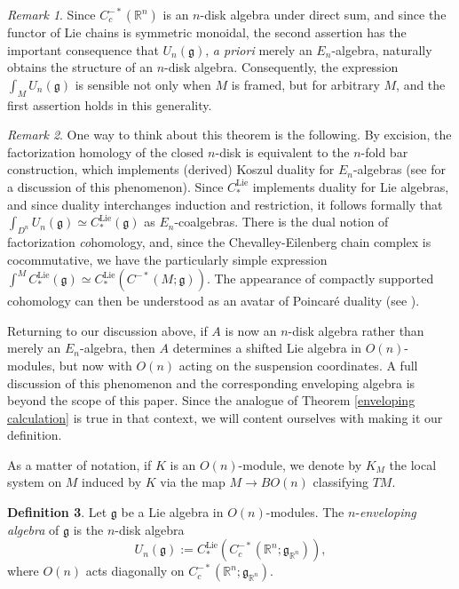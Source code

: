 \documentclass{compositio}
\theoremstyle{definition}\newtheorem{definition}{Definition}[section]
\theoremstyle{theorem}\newtheorem{lemma}[definition]{Lemma}
\theoremstyle{remark}\newtheorem*{conventions}{Conventions}
\theoremstyle{remark}\newtheorem*{acknowledgments}{Acknowledgments}
\theoremstyle{remark}\newtheorem*{outline}{Outline}
\theoremstyle{remark}\newtheorem*{questions}{Questions}
\theoremstyle{remark}\newtheorem{example}[definition]{Example}
\theoremstyle{definition}\newtheorem{construction}[definition]{Construction}
\theoremstyle{definition}\newtheorem*{convention}{Convention}
\theoremstyle{definition}\newtheorem*{conjecture}{Conjecture}
\theoremstyle{theorem}\newtheorem{theorem}[definition]{Theorem}
\theoremstyle{theorem}\newtheorem{paradigm}[definition]{Paradigm}
\theoremstyle{remark}\newtheorem{remark}[definition]{Remark}
\theoremstyle{corollary}\newtheorem{corollary}[definition]{Corollary}
\theoremstyle{theorem}\newtheorem{proposition}[definition]{Proposition}
\theoremstyle{definition}\newtheorem{question}[definition]{Question}
\begin{document}
\begin{remark}
Since $C_c^{-*}(\mathbb{R}^n)$ is an $n$-disk algebra under direct sum, and since the functor of Lie chains is symmetric monoidal, the second assertion has the important consequence that $U_n(\mathfrak{g})$, \emph{a priori} merely an $E_n$-algebra, naturally obtains the structure of an $n$-disk algebra. Consequently, the expression $\int_M U_n(\mathfrak{g})$ is sensible not only when $M$ is framed, but for arbitrary $M$, and the first assertion holds in this generality.
\end{remark}

\begin{remark}
One way to think about this theorem is the following. By excision, the factorization homology of the closed $n$-disk is equivalent to the $n$-fold bar construction, which implements (derived) Koszul duality for $E_n$-algebras (see \cite{Francis} for a discussion of this phenomenon). Since $C_*^{\mathrm{Lie}}$ implements duality for Lie algebras, and since duality interchanges induction and restriction, it follows formally that $\int_{D^n}U_n(\mathfrak{g})\simeq C_*^{\mathrm{Lie}}(\mathfrak{g})$ as $E_n$-coalgebras. There is the dual notion of factorization \emph{co}homology, and, since the Chevalley-Eilenberg chain complex is cocommutative, we have the particularly simple expression $\int^MC_*^{\mathrm{Lie}}(\mathfrak{g})\simeq C_*^{\mathrm{Lie}}(C^{-*}(M;\mathfrak{g}))$. The appearance of compactly supported cohomology can then be understood as an avatar of Poincar\'{e} duality (see \cite{AF}).
\end{remark}

Returning to our discussion above, if $A$ is now an $n$-disk algebra rather than merely an $E_n$-algebra, then $A$ determines a shifted Lie algebra in $O(n)$-modules, but now with $O(n)$ acting on the suspension coordinates. A full discussion of this phenomenon and the corresponding enveloping algebra is beyond the scope of this paper. Since the analogue of Theorem \ref{enveloping calculation} is true in that context, we will content ourselves with making it our definition. 

As a matter of notation, if $K$ is an $O(n)$-module, we denote by $K_M$ the local system on $M$ induced by $K$ via the map $M\to BO(n)$ classifying $TM$.

\begin{definition}
Let $\mathfrak{g}$ be a Lie algebra in $O(n)$-modules. The $n$-\emph{enveloping algebra} of $\mathfrak{g}$ is the $n$-disk algebra $$U_n(\mathfrak{g}):=C_*^{\mathrm{Lie}}(C_c^{-*}(\mathbb{R}^n;\mathfrak{g}_{\mathbb{R}^n})),$$ where $O(n)$ acts diagonally on $C_c^{-*}(\mathbb{R}^n;\mathfrak{g}_{\mathbb{R}^n})$.
\end{definition}
\end{document}
